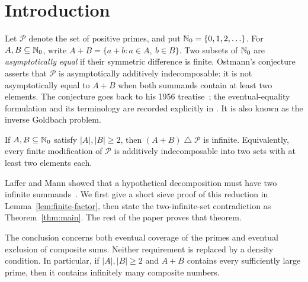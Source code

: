 \section{Introduction}\label{sec:introduction}

Let $\mathcal P$ denote the set of positive primes, and put
$\mathbb N_0=\{0,1,2,\ldots\}$.  For $A,B\subseteq\mathbb N_0$, write
$A+B=\{a+b:a\in A,\ b\in B\}$.  Two subsets of $\mathbb N_0$ are
\emph{asymptotically equal} if their symmetric difference is finite.
Ostmann's conjecture asserts that $\mathcal P$ is asymptotically
additively indecomposable: it is not asymptotically equal to $A+B$ when
both summands contain at least two elements.  The conjecture goes back
to his 1956 treatise~\cite[p.~13]{Ostmann1956}; the eventual-equality
formulation and its terminology are recorded explicitly in
\cite[Definition~1.1 and Conjecture~1.2]{ElsholtzHarper}.
It is also known as the inverse Goldbach problem.

\begin{theorem}\label{cor:ostmann}
If $A,B\subseteq\mathbb N_0$ satisfy $|A|,|B|\ge2$, then
$(A+B)\mathbin{\triangle}\mathcal P$ is infinite.
Equivalently, every finite modification of $\mathcal P$ is additively
indecomposable into two sets with at least two elements each.
\end{theorem}

Laffer and Mann showed that a hypothetical decomposition must have two
infinite summands~\cite[Theorem~12]{LafferMann1964}.  We first give a
short sieve proof of this reduction in Lemma~\ref{lem:finite-factor},
then state the two-infinite-set contradiction as
Theorem~\ref{thm:main}.  The rest of the paper proves that theorem.

The conclusion concerns both eventual coverage of the primes and
eventual exclusion of composite sums.  Neither requirement is replaced
by a density condition.  In particular, if $|A|,|B|\ge2$ and $A+B$
contains every sufficiently large prime, then it contains infinitely
many composite numbers.

